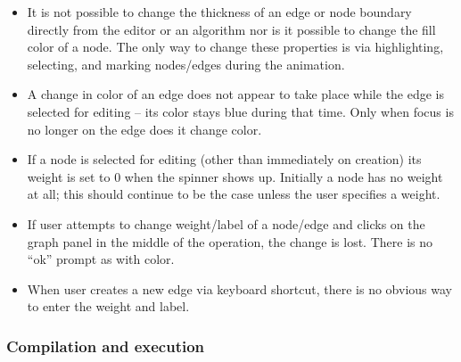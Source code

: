 \begin{itemize}

\item
It is not possible to change the thickness of an edge or node boundary directly
from the editor or an algorithm nor is it possible to change the fill color of a node.
The only way to change these properties is via highlighting, selecting, and
marking nodes/edges during the animation.

\item
A change in color of an edge does not appear to take place while the edge
is selected for editing -- its color stays blue during that time.
Only when focus is no longer on the edge does it change color.

\item If a node is selected for editing (other than immediately on creation)
  its weight is set to 0 when the spinner shows up.  Initially a node has no
  weight at all; this should continue to be the case unless the user
  specifies a weight.

\item If user attempts to change weight/label of a node/edge and clicks on
  the graph panel in the middle of the operation, the change is lost. There
  is no ``ok'' prompt as with color.

\item When user creates a new edge via keyboard shortcut, there is no obvious
  way to enter the weight and label.

\end{itemize}

\subsubsection*{Compilation and execution}

